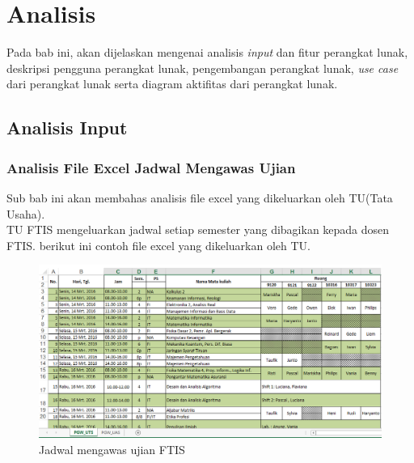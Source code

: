  \chapter{Analisis}
\label{chap:analysis}
Pada bab ini, akan dijelaskan mengenai analisis \textit{input} dan fitur perangkat lunak, deskripsi pengguna perangkat lunak,  pengembangan perangkat lunak, \textit{use case} dari perangkat lunak serta diagram aktifitas dari perangkat lunak.
\section{Analisis Input}
\subsection{Analisis File Excel Jadwal Mengawas Ujian}
Sub bab ini akan membahas analisis file excel yang dikeluarkan oleh TU(Tata Usaha).\\
TU FTIS mengeluarkan jadwal setiap semester yang dibagikan kepada dosen FTIS. 
berikut ini contoh file excel yang dikeluarkan oleh TU. 
\begin{figure}[H]
	\centering
	\includegraphics[scale=0.5]{Gambar/scJadwal}
	\caption{Jadwal mengawas ujian FTIS}
	\label{fig:jadwalLamapng}
	\end{figure}

